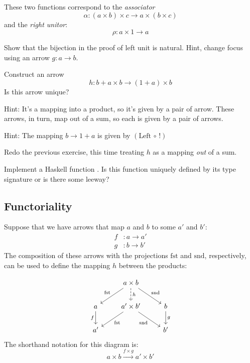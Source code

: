 \documentclass[DaoFP]{subfiles}
\begin{document}
These two functions correspond to the \emph{associator}
\[ \alpha \colon (a \times b) \times c \to a \times (b \times c) \]
and the \emph{right unitor}:
\[ \rho \colon a \times 1 \to a \]

\begin{exercise}
Show that the bijection in the proof of left unit is natural. Hint, change focus using an arrow $g \colon a \to b$.
\end{exercise}

\begin{exercise}
Construct an arrow 
\[ h \colon b + a \times b \to (1 + a) \times b \]
Is this arrow unique?

Hint: It's a mapping into a product, so it's given by a pair of arrow. These arrows, in turn, map out of a sum, so each is given by a pair of arrows. 

Hint: The mapping $b \to 1 + a$ is given by $(\text{Left} \, \circ \, !)$
\end{exercise}

\begin{exercise}
Redo the previous exercise, this time treating $h$ as a mapping \emph{out} of a sum. 
\end{exercise}

\begin{exercise}
Implement a Haskell function . Is this function uniquely defined by its type signature or is there some leeway?
\end{exercise}

\subsection{Functoriality}

Suppose that we have arrows that map $a$ and $b$ to some $a'$ and $b'$:
\begin{align*}
f &\colon a \to a' \\
g &\colon b \to b'
\end{align*}
The composition of these arrows with the projections $\text{fst}$ and $\text{snd}$, respectively, can be used to define the mapping $h$ between the products:

\[
 \begin{tikzcd}
 & a \times b
\arrow[d, dashed, "h"]
 \arrow[dl,  "\text{fst}"']
 \arrow[dr,   "\text{snd}"]
\\
a
\arrow[d, "f"']
&a' \times b'
 \arrow[dl,  "\text{fst}"]
  \arrow[dr,   "\text{snd}"']
& b
\arrow[d, "g"]
\\
a' && b'
 \end{tikzcd}
\]
The shorthand notation for this diagram is:
\[ a \times b \xrightarrow{f \times g} a' \times b' \]
\end{document}
